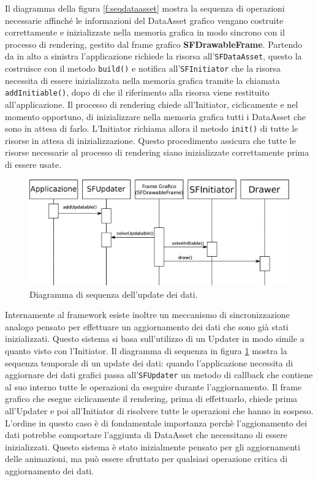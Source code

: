 Il diagramma della figura \ref{f:seqdataasset} mostra la sequenza di operazioni necessarie affinch\'e le informazioni del DataAsset grafico vengano costruite correttamente e inizializzate nella memoria grafica in modo sincrono con il processo di rendering, gestito dal frame grafico \textbf{SFDrawableFrame}. Partendo da in alto a sinistra l'applicazione richiede la risorsa all'\texttt{SFDataAsset}, questo la costruisce con il metodo \texttt{build()} e notifica all'\texttt{SFInitiator} che la risorsa necessita di essere inizializzata nella memoria grafica tramite la chiamata \texttt{addInitiable()}, dopo di che il riferimento alla risorsa viene restituito all'applicazione.
Il processo di rendering chiede all'Initiator, ciclicamente e nel momento opportuno, di inizializzare nella memoria grafica tutti i DataAsset che sono in attesa di farlo. L'Initiator richiama allora il metodo \texttt{init()} di tutte le risorse in attesa di inizializzazione.
Questo procedimento assicura che tutte le risorse necessarie al processo di rendering siano inizializzate correttamente prima di essere usate.

\begin{figure}
\begin{center}
\includegraphics[width=\textwidth]{Immagini/sequenzaUpdatable}
\caption{Diagramma di sequenza dell'update dei dati.\label{f:sequpdate}} 
\end{center} 
\end{figure}

Internamente al framework esiste inoltre un meccanismo di sincronizzazione analogo pensato per effettuare un aggiornamento dei dati che sono gi\`a stati inizializzati. Questo sistema si basa sull'utilizzo di un Updater in modo simile a quanto visto con l'Initiator. Il diagramma di sequenza in figura \ref{f:sequpdate} mostra la sequenza temporale di un update dei dati: quando l'applicazione necessita di aggiornare dei dati grafici passa all'\texttt{SFUpdater} un metodo di callback che contiene al suo interno tutte le operazioni da eseguire durante l'aggiornamento.
Il frame grafico che esegue ciclicamente il rendering, prima di effettuarlo, chiede prima all'Updater e poi all'Initiator di risolvere tutte le operazioni che hanno in sospeso. L'ordine in questo caso \`e di fondamentale importanza perch\`e l'aggionamento dei dati potrebbe comportare l'aggiunta di DataAsset che necessitano di essere inizializzati. Questo sistema \`e stato inizialmente pensato per gli aggiornamenti delle animazioni, ma pu\`o essere sfruttato per qualsiasi operazione critica di aggiornamento dei dati.

